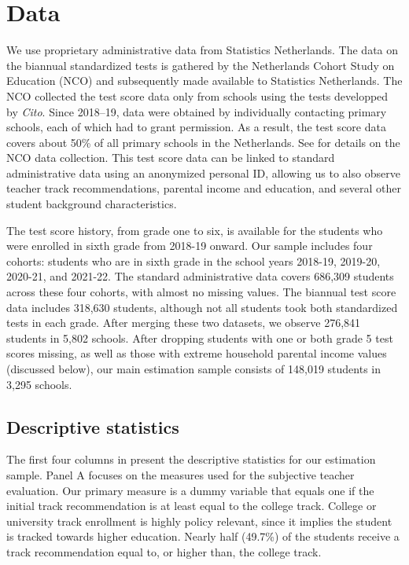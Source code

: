 \section{Data}\label{sec:Data}

We use proprietary administrative data from Statistics Netherlands. The data on the biannual standardized tests is gathered by the Netherlands Cohort Study on Education (NCO) and subsequently made available to Statistics Netherlands. The NCO collected the test score data only from schools using the tests developped by \textit{Cito}. Since 2018–19, data were obtained by individually contacting primary schools, each of which had to grant permission. As a result, the test score data covers about 50\% of all primary schools in the Netherlands. See \cite{haelermans2020using} for details on the NCO data collection. This test score data can be linked to standard administrative data using an anonymized personal ID, allowing us to also observe teacher track recommendations, parental income and education, and several other student background characteristics.

The test score history, from grade one to six, is available for the students who were enrolled in sixth grade from 2018-19 onward. Our sample includes four cohorts: students who are in sixth grade in the school years 2018-19, 2019-20, 2020-21, and 2021-22. The standard administrative data covers 686,309 students across these four cohorts, with almost no missing values. The biannual test score data includes 318,630 students, although not all students took both standardized tests in each grade. After merging these two datasets, we observe 276,841 students in 5,802 schools. After dropping students with one or both grade 5 test scores missing, as well as those with extreme household parental income values (discussed below), our main estimation sample consists of 148,019 students in 3,295 schools.

\subsection{Descriptive statistics}



The first four columns in  present the descriptive statistics for our estimation sample. Panel A focuses on the measures used for the subjective teacher evaluation. Our primary measure is a dummy variable that equals one if the initial track recommendation is at least equal to the college track. College or university track enrollment is highly policy relevant, since it implies the student is tracked towards higher education. Nearly half (49.7\%) of the students receive a track recommendation equal to, or higher than, the college track.

